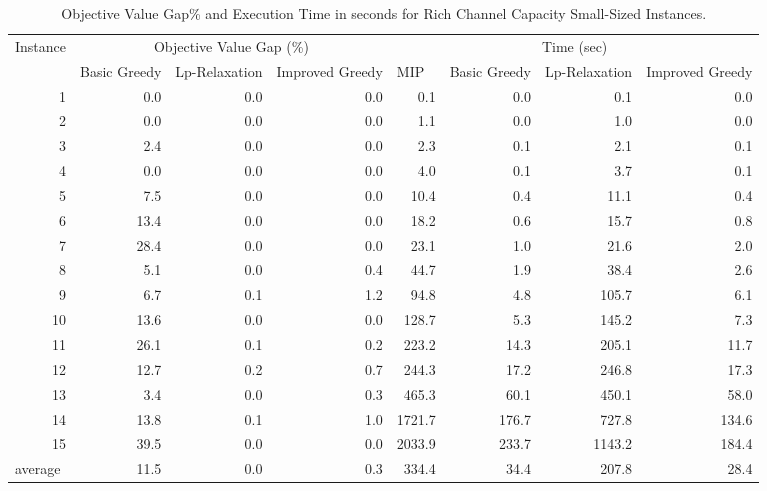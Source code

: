 \documentclass[11pt]{article}
\begin{document}
\begin{table}[htbp]
  \centering
  \caption{Objective Value Gap\% and Execution Time in seconds for Rich Channel Capacity Small-Sized Instances.}\label{table:tbl_exact_rich_results_small}
  \begin{adjustbox}{max width=1\textwidth}
    \begin{tabular}{|l|rrr|rrrr|}
    \toprule
    \multicolumn{1}{|c|}{\multirow{2}[4]{*}{Instance}} & \multicolumn{3}{c|}{Objective Value Gap (\%)} & \multicolumn{4}{c|}{Time (sec)} \\
\cmidrule{2-8}          & \multicolumn{1}{l}{Basic Greedy} & \multicolumn{1}{l}{Lp-Relaxation} & \multicolumn{1}{l|}{Improved Greedy} & \multicolumn{1}{l}{MIP} & \multicolumn{1}{l}{Basic Greedy} & \multicolumn{1}{l}{Lp-Relaxation} & \multicolumn{1}{l|}{Improved Greedy} \\
    \midrule
    \multicolumn{1}{|r|}{1} & 0.0     & 0.0     & 0.0     & 0.1   & 0.0     & 0.1  & 0.0 \\
    \multicolumn{1}{|r|}{2} & 0.0     & 0.0     & 0.0     & 1.1   & 0.0     & 1.0     & 0.0 \\
    \multicolumn{1}{|r|}{3} & 2.4   & 0.0     & 0.0     & 2.3   & 0.1   & 2.1   & 0.1 \\
    \multicolumn{1}{|r|}{4} & 0.0     & 0.0     & 0.0     & 4.0     & 0.1   & 3.7   & 0.1 \\
    \multicolumn{1}{|r|}{5} & 7.5   & 0.0     & 0.0     & 10.4  & 0.4   & 11.1  & 0.4 \\
    \multicolumn{1}{|r|}{6} & 13.4  & 0.0     & 0.0     & 18.2  & 0.6   & 15.7  & 0.8 \\
    \multicolumn{1}{|r|}{7} & 28.4  & 0.0     & 0.0     & 23.1  & 1.0     & 21.6  & 2.0 \\
    \multicolumn{1}{|r|}{8} & 5.1   & 0.0     & 0.4   & 44.7  & 1.9   & 38.4  & 2.6 \\
    \multicolumn{1}{|r|}{9} & 6.7   & 0.1   & 1.2   & 94.8  & 4.8   & 105.7 & 6.1 \\
    \multicolumn{1}{|r|}{10} & 13.6  & 0.0     & 0.0     & 128.7 & 5.3   & 145.2 & 7.3 \\
    \multicolumn{1}{|r|}{11} & 26.1  & 0.1   & 0.2   & 223.2 & 14.3  & 205.1 & 11.7 \\
    \multicolumn{1}{|r|}{12} & 12.7  & 0.2   & 0.7   & 244.3 & 17.2  & 246.8 & 17.3 \\
    \multicolumn{1}{|r|}{13} & 3.4   & 0.0     & 0.3   & 465.3 & 60.1  & 450.1 & 58.0 \\
    \multicolumn{1}{|r|}{14} & 13.8  & 0.1   & 1.0     & 1721.7 & 176.7 & 727.8 & 134.6 \\
    \multicolumn{1}{|r|}{15} & 39.5  & 0.0     & 0.0     & 2033.9 & 233.7 & 1143.2 & 184.4 \\
    \midrule
    average & 11.5  & 0.0   & 0.3   & 334.4 & 34.4  & 207.8 & 28.4 \\
    \bottomrule
    \end{tabular}
  \end{adjustbox}
\end{table}
\end{document}
